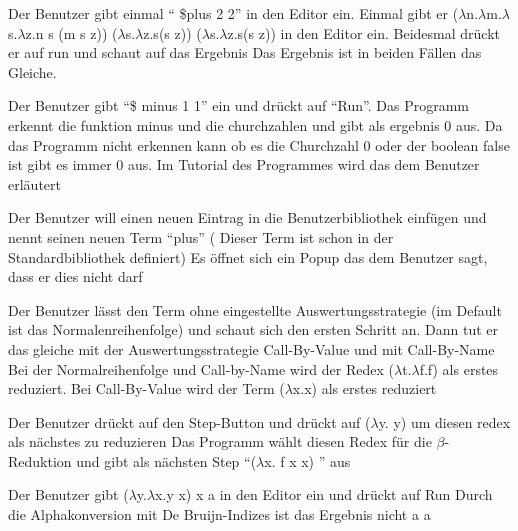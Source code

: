 \documentclass[parskip=full,11pt,twoside]{scrartcl}
\begin{document}
{Der Benutzer gibt einmal \enquote{	\$plus 2 2} in den Editor ein. Einmal gibt er ($\lambda$n.$\lambda$m.$\lambda$s.$\lambda$z.n s (m s z)) ($\lambda$s.$\lambda$z.s(s z)) ($\lambda$s.$\lambda$z.s(s z)) in den Editor ein. Beidesmal drückt er auf run und schaut auf das Ergebnis}
{Das Ergebnis ist in beiden Fällen das Gleiche. }

{Der Benutzer gibt \enquote{\$ minus 1 1} ein und drückt auf \enquote{Run}.}
{Das Programm erkennt die funktion minus und die churchzahlen und gibt als ergebnis 0 aus. Da das Programm nicht erkennen kann ob es die Churchzahl 0 oder der boolean false ist gibt es immer 0 aus. Im Tutorial des Programmes wird das dem Benutzer erläutert }

{Der Benutzer will einen neuen Eintrag in die Benutzerbibliothek einfügen und nennt seinen neuen Term \enquote{plus} ( Dieser Term ist schon in der Standardbibliothek definiert) }
{Es öffnet sich ein Popup das dem Benutzer sagt, dass er dies nicht darf}



{Der Benutzer lässt den Term ohne eingestellte Auswertungsstrategie (im Default ist das Normalenreihenfolge) und schaut sich den ersten Schritt an. Dann tut er das gleiche mit der Auswertungsstrategie Call-By-Value und  mit Call-By-Name}
{ Bei der Normalreihenfolge und Call-by-Name wird der Redex ($\lambda$t.$\lambda$f.f) als erstes reduziert. Bei Call-By-Value wird der Term ($\lambda$x.x) als erstes reduziert }

{Der Benutzer drückt auf den Step-Button und drückt auf ($\lambda$y. y) um diesen redex als nächstes zu reduzieren}
{Das Programm wählt diesen Redex für die $\beta$-Reduktion und gibt als nächsten Step \enquote{($\lambda$x. f x x) } aus  }


{ Der Benutzer gibt ($\lambda$y.$\lambda$x.y x) x a in den Editor ein und drückt auf Run}
{ Durch die Alphakonversion mit De Bruijn-Indizes ist das Ergebnis nicht a  a  }
\end{document}
